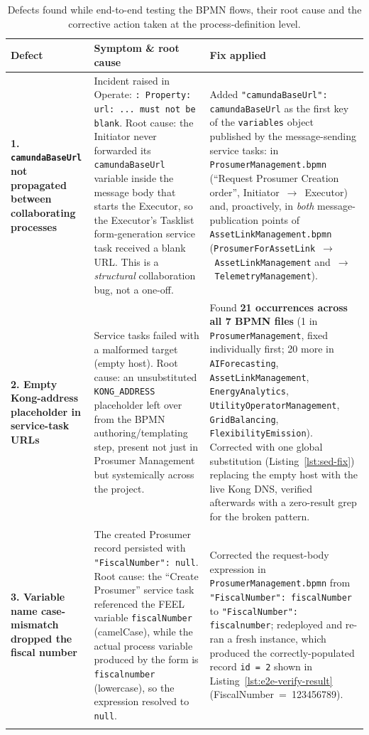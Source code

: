 \documentclass[11pt,a4paper]{article}
\begin{document}
\begin{footnotesize}
\begin{longtable}{@{}p{}!{\color{black!25}\vrule}p{0.37\textwidth}!{\color{black!25}\vrule}p{0.37\textwidth}@{}}
\toprule
\textbf{Defect} & \textbf{Symptom \& root cause} & \textbf{Fix applied} \\
\midrule
\endhead
\textbf{1. \texttt{camundaBaseUrl} not propagated between collaborating processes}
&
Incident raised in Operate: \texttt{: Property: url: ... must not be blank}. Root cause: the Initiator never forwarded its \texttt{camundaBaseUrl} variable inside the message body that starts the Executor, so the Executor's Tasklist form-generation service task received a blank URL. This is a \emph{structural} collaboration bug, not a one-off. &
Added \texttt{"camundaBaseUrl": camundaBaseUrl} as the first key of the \texttt{variables} object published by the message-sending service tasks: in \texttt{ProsumerManagement.bpmn} (``Request Prosumer Creation order'', Initiator~$\to$~Executor) and, proactively, in \emph{both} message-publication points of \texttt{AssetLinkManagement.bpmn} (\texttt{ProsumerForAssetLink}~$\to$~\texttt{AssetLinkManagement} and~$\to$~\texttt{TelemetryManagement}). \\
\addlinespace
\textbf{2. Empty Kong-address placeholder in service-task URLs}
&
Service tasks failed with a malformed target \texttt{} (empty host). Root cause: an unsubstituted \texttt{KONG\_ADDRESS} placeholder left over from the BPMN authoring/templating step, present not just in Prosumer Management but systemically across the project. &
Found \textbf{21 occurrences across all 7 BPMN files} (1 in \texttt{ProsumerManagement}, fixed individually first; 20 more in \texttt{AIForecasting}, \texttt{AssetLinkManagement}, \texttt{EnergyAnalytics}, \texttt{UtilityOperatorManagement}, \texttt{GridBalancing}, \texttt{FlexibilityEmission}). Corrected with one global substitution (Listing~\ref{lst:sed-fix}) replacing the empty host with the live Kong DNS, verified afterwards with a zero-result grep for the broken pattern. \\
\addlinespace
\textbf{3. Variable name case-mismatch dropped the fiscal number}
&
The created Prosumer record persisted with \texttt{"FiscalNumber": null}. Root cause: the ``Create Prosumer'' service task referenced the FEEL variable \texttt{fiscalNumber} (camelCase), while the actual process variable produced by the form is \texttt{fiscalnumber} (lowercase), so the expression resolved to \texttt{null}. &
Corrected the request-body expression in \texttt{ProsumerManagement.bpmn} from \texttt{"FiscalNumber": fiscalNumber} to \texttt{"FiscalNumber": fiscalnumber}; redeployed and re-ran a fresh instance, which produced the correctly-populated record \texttt{id = 2} shown in Listing~\ref{lst:e2e-verify-result} (FiscalNumber~=~123456789). \\
\bottomrule
\caption{Defects found while end-to-end testing the BPMN flows, their root cause and the corrective action taken at the process-definition level.}
\label{tab:bugs}
\end{longtable}
\end{footnotesize}
\end{document}

